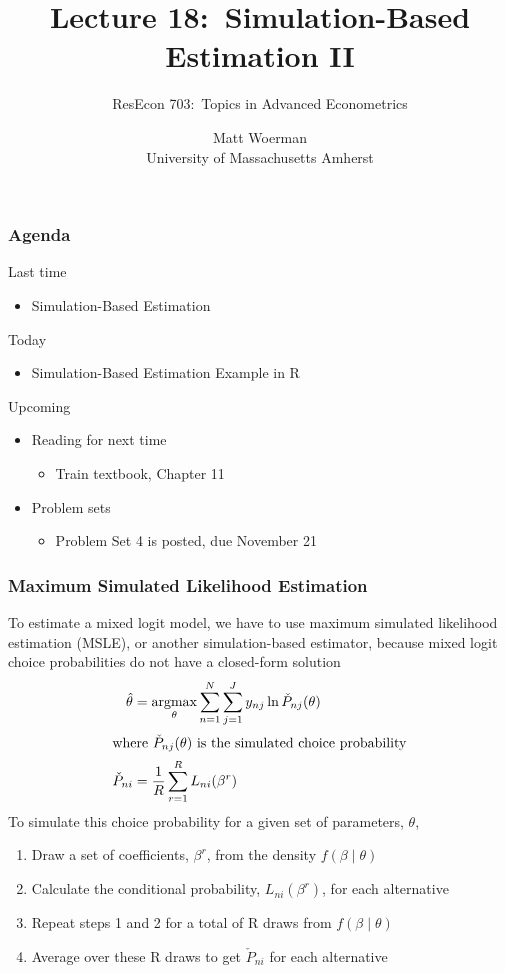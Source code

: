 \documentclass{beamer}
\title[Lecture 18:\ Simulation-Based Estimation II]{Lecture 18:\ Simulation-Based Estimation II}
\author[ResEcon 703:\ Advanced Econometrics]{ResEcon 703:\ Topics in Advanced Econometrics}
\date{Matt Woerman\\University of Massachusetts Amherst}
\DeclareMathOperator*{\argmax}{argmax}
\begin{document}
{ 
\begin{frame}[noframenumbering]
    \titlepage
\end{frame}
}

\begin{frame}\frametitle{Agenda}
    Last time
    \begin{itemize}
        \item Simulation-Based Estimation
    \end{itemize}
    \vspace{2ex}
    Today
    \begin{itemize}
        \item Simulation-Based Estimation Example in R
    \end{itemize}
    \vspace{2ex}
    Upcoming
    \begin{itemize}
        \item Reading for next time
        \begin{itemize}
            \item Train textbook, Chapter 11
        \end{itemize}
        \item Problem sets
        \begin{itemize}
            \item Problem Set 4 is posted, due November 21
        \end{itemize}
    \end{itemize}
\end{frame}

\begin{frame}\frametitle{Maximum Simulated Likelihood Estimation}
	To estimate a mixed logit model, we have to use maximum simulated likelihood estimation (MSLE), or another simulation-based estimator, because mixed logit choice probabilities do not have a closed-form solution 
	\begin{align*}
    	\hat{\theta} &= \argmax_\theta \sum_{n = 1}^N \sum_{j = 1}^J y_{nj} \ln \check{P}_{nj}(\theta) \\
    	\intertext{where $\check{P}_{nj}(\theta)$ is the simulated choice probability}
    	\check{P}_{ni} &= \frac{1}{R} \sum_{r = 1}^R L_{ni}(\beta^r)
    \end{align*}
    To simulate this choice probability for a given set of parameters, $\theta$,
    \begin{enumerate}
        \item Draw a set of coefficients, $\beta^r$, from the density $f(\beta \mid \theta)$
        \item Calculate the conditional probability, $L_{ni}(\beta^r)$, for each alternative
        \item Repeat steps 1 and 2 for a total of R draws from $f(\beta \mid \theta)$
        \item Average over these R draws to get $\check{P}_{ni}$ for each alternative
    \end{enumerate}
\end{frame}
\end{document}
